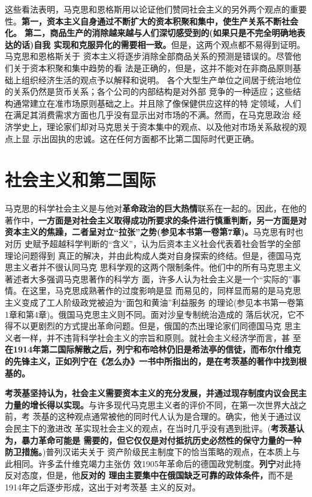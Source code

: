 这些看法表明，马克思和恩格斯用以论证他们赞同社会主义的另外两个观点的重要
性。\textbf{第一，资本主义自身通过不断扩大的资本积聚和集中，使生产关系不断社会化。
  第二，商品生产的消除越来越与人们深切感受到的(如果只是不完全明确地表达的话)自我
  实现和克服异化的需要相一致。}但是，这两个观点都不易得到证明。马克思和恩格斯关于
资本主义将逐步消除全部商品关系的预测是错误的。尽管他们关于资本积聚和集中趋势的看
法是正确的，但是，这并不能对在非商品原则基础上组织经济生活的观点予以解释和说明。
各个大型生产单位之间居于统治地位的关系仍然是货币关系；各个公司的内部结构是对外部
竞争的一种适应；这些结构通常建立在准市场原则基础之上。并且除了像保健供应这样的特
定领域，人们在满足其消费需求方面也几乎没有显示出对市场的不满。然而，在马克思政治
经济学史上，理论家们却对马克思关于资本集中的观点、以及他对市场关系敌视的观点上显
示出固执的忠诚。这在任何方面都不比第二国际时代更正确。

\section{社会主义和第二国际}

马克思的科学社会主义是与他对\textbf{革命政治的巨大热情}联系在一起的。因此，在他的
著作中，\textbf{一方面是对社会主义取得成功所要求的条件进行慎重判断，另一方面是对
  资本主义的焦躁，二者呈对立“拉张”之势(参见本书第一卷第7章)。}马克思有时也对历
史赋予超越科学判断的“含义”，认为后资本主义社会代表着社会哲学的全部理论问题得到
真正的解决，并由此构成人类对自身探索的终结。但是，德国马克思主义者并不很认同马克
思科学观的这两个限制条件。他们中的所有马克思主义著述者大多强调马克思著作的科学方
面，许多人认为社会主义是一个“实际的”事情。在这里，马克思成熟著作的过度影响是显
而易见的，同样显而易的是马克思主义变成了工人阶级政党被迫为“面包和黄油”利益服务
的理论(参见本书第一卷第1章和第4章)。俄国马克思主义则不同。面对沙皇专制统治造成的
落后状况，它不得不以更剧烈的方式提出革命问题。但是，俄国的杰出理论家们同德国马克
思主义者一样，并不违背科学社会主义的宗旨和原则。就社会主义经济学而言，甚
至\textbf{在1914年第二国际解散之后，列宁和布哈林仍旧是希法亭的信徒，而布尔什维克
  的先锋主义，正如列宁在《怎么办》一书中所指出的，是在考茨基的著作中找到根基的。}

\textbf{考茨基坚持认为，社会主义需要资本主义的充分发展，并通过现存制度内议会民主
  力量的增长得以实现。}与许多现代马克思主义者的评价不同，在第一次世界大战之前，考
茨基的这种观点通常被他的同时代人认为是合理的。确实，他关于通过议会民主下的激进改
革实现社会主义的观点，在当时几乎没有遇到批评。(\textbf{考茨基认为，暴力革命可能是
  需要的，但它仅仅是对付抵抗历史必然性的保守力量的一种防卫措施。})普列汉诺夫关于
资产阶级民主制度下的恰当策略的观点，在本质上与此相同。许多孟什维克竭力主张仿
效1905年革命后的德国政党制度。\textbf{列宁}对此持反对态度，但是，他\textbf{反对的
  理由主要集中在俄国缺乏可靠的政体条件，}而不是1914年之后逐步形成，这出于对考茨基
主义的反对。

